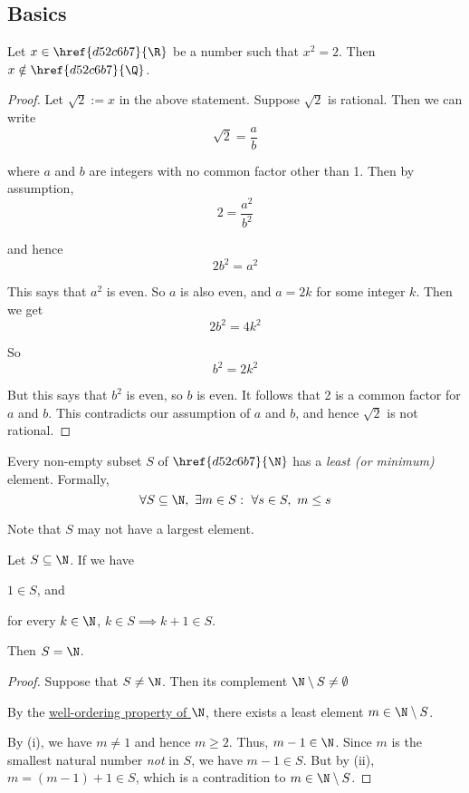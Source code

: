 \subsection{Basics}\label{fbd96f6}

\label{c2585a1}

Let $x\in\href{d52c6b7}{\R}$ be a number such that $x^2=2$. Then
$x\notin\href{d52c6b7}{\Q}$.

\begin{proof}
  Let $\sqrt2:=x$ in the above statement. Suppose $\sqrt2$ is rational. Then we
  can write
  $$
    \sqrt2=\frac ab
  $$

  where $a$ and $b$ are integers with no common factor other than 1. Then by
  assumption,
  $$
    2=\frac{a^2}{b^2}
  $$

  and hence
  $$
    2b^2=a^2
  $$

  This says that $a^2$ is even. So $a$ is also even, and $a=2k$ for some
  integer $k$. Then we get
  $$
    2b^2=4k^2
  $$

  So
  $$
    b^2=2k^2
  $$

  But this says that $b^2$ is even, so $b$ is even. It follows that 2 is a
  common factor for $a$ and $b$. This contradicts our assumption of $a$ and
  $b$, and hence $\sqrt2$ is not rational.
\end{proof}

\label{cd7c4d1}

Every non-empty subset $S$ of $\href{d52c6b7}{\N}$ has a \textit{least (or
minimum)} element. Formally,
$$
  \forall S\subseteq\N,\ \exists m\in S:\ \forall s\in S,\ m\leq s
$$

Note that $S$ may not have a largest element.

\label{a824f8c}

Let $S\subseteq\N$. If we have
\begin{enumerati}
  \item $1\in S$, and
  \item for every $k\in\N$, $k\in S\implies k+1\in S$.
\end{enumerati}

Then $S=\N$.

\begin{proof}
  Suppose that $S\neq\N$. Then its complement $\N\setminus S\neq\emptyset$

  By the \href{cd7c4d1}{well-ordering property of $\N$}, there exists a least
  element $m\in\N\setminus S$.

  By (i), we have $m\neq 1$ and hence $m\geq2$. Thus, $m-1\in\N$. Since $m$ is
  the smallest natural number \textit{not} in $S$, we have $m-1\in S$. But by
  (ii), $m=(m-1)+1\in S$, which is a contradition to $m\in\N\setminus S$.
\end{proof}

